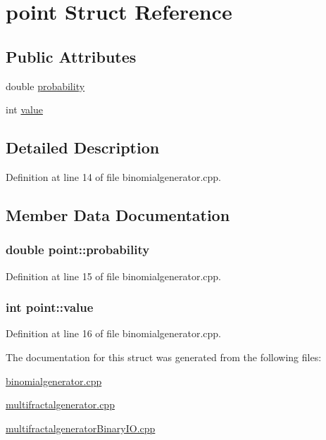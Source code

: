 \hypertarget{structpoint}{\section{point Struct Reference}
\label{structpoint}
}
\subsection*{Public Attributes}
\begin{DoxyCompactItemize}
\item 
double \hyperlink{structpoint_a8f31325f2113647012d492ae9761d353}{probability}
\item 
int \hyperlink{structpoint_a6fb8ebef3d355ac05818986884eeadff}{value}
\end{DoxyCompactItemize}


\subsection{Detailed Description}


Definition at line 14 of file binomialgenerator.\-cpp.



\subsection{Member Data Documentation}
\hypertarget{structpoint_a8f31325f2113647012d492ae9761d353}{
\subsubsection[{probability}]{\setlength{\rightskip}{0pt plus 5cm}double point\-::probability}}\label{structpoint_a8f31325f2113647012d492ae9761d353}


Definition at line 15 of file binomialgenerator.\-cpp.

\hypertarget{structpoint_a6fb8ebef3d355ac05818986884eeadff}{
\subsubsection[{value}]{\setlength{\rightskip}{0pt plus 5cm}int point\-::value}}\label{structpoint_a6fb8ebef3d355ac05818986884eeadff}


Definition at line 16 of file binomialgenerator.\-cpp.



The documentation for this struct was generated from the following files\-:\begin{DoxyCompactItemize}
\item 
\hyperlink{binomialgenerator_8cpp}{binomialgenerator.\-cpp}\item 
\hyperlink{multifractalgenerator_8cpp}{multifractalgenerator.\-cpp}\item 
\hyperlink{multifractalgenerator_binary_i_o_8cpp}{multifractalgenerator\-Binary\-I\-O.\-cpp}\end{DoxyCompactItemize}
